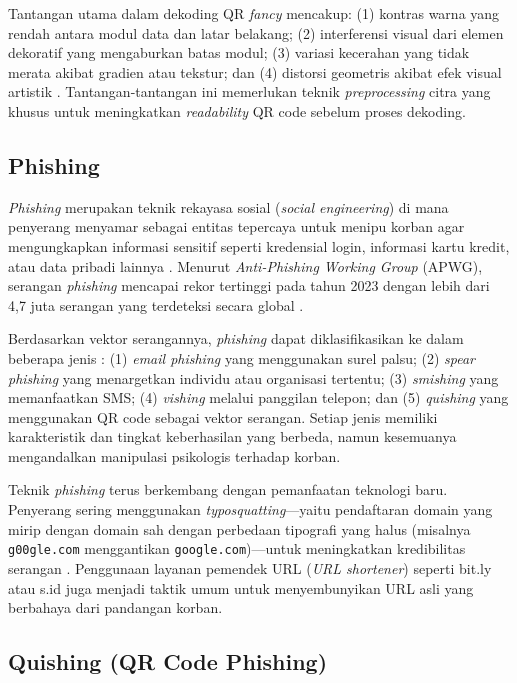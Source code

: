 \documentclass[conference]{IEEEtran}
\begin{document}
Tantangan utama dalam dekoding QR \textit{fancy} mencakup: (1) kontras warna yang rendah antara modul data dan latar belakang; (2) interferensi visual dari elemen dekoratif yang mengaburkan batas modul; (3) variasi kecerahan yang tidak merata akibat gradien atau tekstur; dan (4) distorsi geometris akibat efek visual artistik \cite{chu_halftone_2013}. Tantangan-tantangan ini memerlukan teknik \textit{preprocessing} citra yang khusus untuk meningkatkan \textit{readability} QR code sebelum proses dekoding.

\subsection{Phishing}

\textit{Phishing} merupakan teknik rekayasa sosial (\textit{social engineering}) di mana penyerang menyamar sebagai entitas tepercaya untuk menipu korban agar mengungkapkan informasi sensitif seperti kredensial login, informasi kartu kredit, atau data pribadi lainnya \cite{owasp_phishing}. Menurut \textit{Anti-Phishing Working Group} (APWG), serangan \textit{phishing} mencapai rekor tertinggi pada tahun 2023 dengan lebih dari 4,7 juta serangan yang terdeteksi secara global \cite{apwg_report_2023}.

Berdasarkan vektor serangannya, \textit{phishing} dapat diklasifikasikan ke dalam beberapa jenis \cite{alkhalil_phishing_2021}: (1) \textit{email phishing} yang menggunakan surel palsu; (2) \textit{spear phishing} yang menargetkan individu atau organisasi tertentu; (3) \textit{smishing} yang memanfaatkan SMS; (4) \textit{vishing} melalui panggilan telepon; dan (5) \textit{quishing} yang menggunakan QR code sebagai vektor serangan. Setiap jenis memiliki karakteristik dan tingkat keberhasilan yang berbeda, namun kesemuanya mengandalkan manipulasi psikologis terhadap korban.

Teknik \textit{phishing} terus berkembang dengan pemanfaatan teknologi baru. Penyerang sering menggunakan \textit{typosquatting}---yaitu pendaftaran domain yang mirip dengan domain sah dengan perbedaan tipografi yang halus (misalnya \texttt{g00gle.com} menggantikan \texttt{google.com})---untuk meningkatkan kredibilitas serangan \cite{szurdi_email_2017}. Penggunaan layanan pemendek URL (\textit{URL shortener}) seperti bit.ly atau s.id juga menjadi taktik umum untuk menyembunyikan URL asli yang berbahaya dari pandangan korban.

\subsection{Quishing (QR Code Phishing)}
\end{document}
